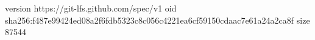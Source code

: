 version https://git-lfs.github.com/spec/v1
oid sha256:f487e99424ed08a2f6fdb5323c8c056c4221ea6cf59150cdaac7e61a24a2ca8f
size 87544
